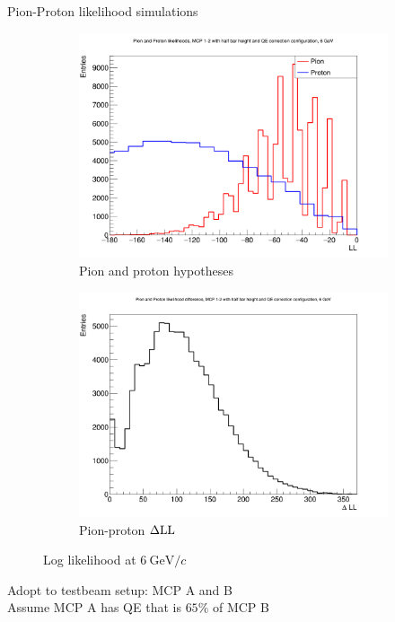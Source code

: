 \documentclass{beamer}
\begin{document}
\begin{frame}{Pion-Proton likelihood simulations}
  \begin{figure}
    \centering
    \vspace{-0.2cm}
    \begin{subfigure}{0.5\textwidth}
      \includegraphics[width = 1.0\textwidth]{Plots/ProtonPionLL6GeVStandardMCPAB.png}
      \caption{Pion and proton hypotheses}
    \end{subfigure}%
    \begin{subfigure}{0.5\textwidth}
      \includegraphics[width = 1.0\textwidth]{Plots/ProtonPionDLL6GeVStandardMCPAB.png}
      \caption{Pion-proton $\Delta{\rm LL}$}
    \end{subfigure}
    \caption{Log likelihood at $\SI{6}{\giga\eV/c}$}
  \end{figure}
  \begin{center}
    Adopt to testbeam setup: MCP A and B\\
    Assume MCP A has QE that is $65\%$ of MCP B
  \end{center}
\end{frame}
\end{document}
